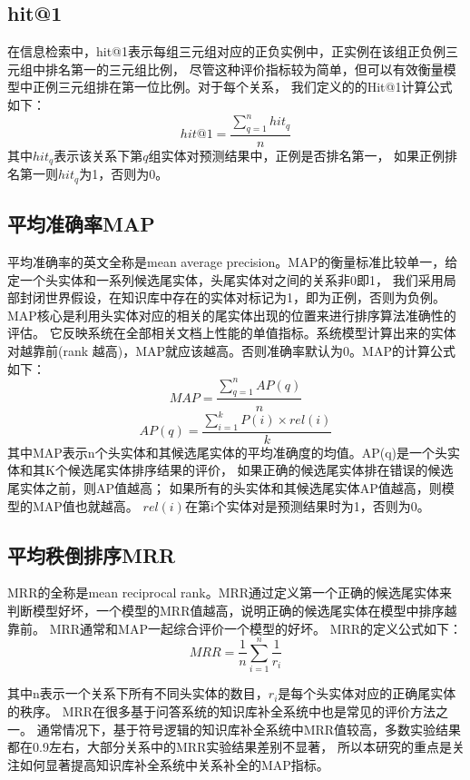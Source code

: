 \subsection{hit@1}
在信息检索中，hit@1表示每组三元组对应的正负实例中，正实例在该组正负例三元组中排名第一的三元组比例，
尽管这种评价指标较为简单，但可以有效衡量模型中正例三元组排在第一位比例。对于每个关系，
我们定义的的Hit@1计算公式如下：
$$hit@1=\frac{\sum_{q=1}^n{hit_q}}{n}$$
其中$hit_q$表示该关系下第$q$组实体对预测结果中，正例是否排名第一，
如果正例排名第一则$hit_q$为1，否则为0。

\subsection{平均准确率MAP}
平均准确率的英文全称是mean average precision。MAP的衡量标准比较单一，给定一个头实体和一系列候选尾实体，头尾实体对之间的关系非0即1，
我们采用局部封闭世界假设，在知识库中存在的实体对标记为1，即为正例，否则为负例。
MAP核心是利用头实体对应的相关的尾实体出现的位置来进行排序算法准确性的评估。
它反映系统在全部相关文档上性能的单值指标。系统模型计算出来的实体对越靠前(rank 越高)，MAP就应该越高。否则准确率默认为0。MAP的计算公式如下：
$$MAP=\frac{\sum_{q=1}^nAP(q)}{n}$$
$$AP(q)=\frac{\sum_{i=1}^kP(i)\times rel(i)}{k}$$
其中MAP表示n个头实体和其候选尾实体的平均准确度的均值。AP(q)是一个头实体和其K个候选尾实体排序结果的评价，
如果正确的候选尾实体排在错误的候选尾实体之前，则AP值越高；
如果所有的头实体和其候选尾实体AP值越高，则模型的MAP值也就越高。
$rel(i)$在第i个实体对是预测结果时为1，否则为0。

\subsection{平均秩倒排序MRR}
MRR的全称是mean reciprocal rank。MRR通过定义第一个正确的候选尾实体来判断模型好坏，一个模型的MRR值越高，说明正确的候选尾实体在模型中排序越靠前。
MRR通常和MAP一起综合评价一个模型的好坏。
MRR的定义公式如下：
$$MRR=\frac{1}{n} \sum_{i=1}^n \frac{1}{r_i}$$

其中n表示一个关系下所有不同头实体的数目，$r_i$是每个头实体对应的正确尾实体的秩序。
MRR在很多基于问答系统的知识库补全系统\cite{West2014}中也是常见的评价方法之一。
通常情况下，基于符号逻辑的知识库补全系统中MRR值较高，多数实验结果都在0.9左右，大部分关系中的MRR实验结果差别不显著，
所以本研究的重点是关注如何显著提高知识库补全系统中关系补全的MAP指标。


